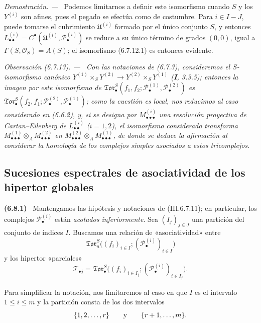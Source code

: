 \documentclass[10pt,oneside]{book}
\newcommand{\sh}[1]{\mathscr{#1}}
\newcommand{\sref}[2][]{\textup{(#2)}}
\newcommand{\oldpage}[2][]{\setcounter{footnote}{0}\marginpar{\scriptsize\textbf{#1}~|~#2}\ignorespaces}
\newenvironment{env}[1][]{\par\medskip\noindent\textbf{(#1)}\ }{\par}
\newenvironment{remark}[1][]{\par\medskip\noindent\itshape Observación (#1). ---\ }{\par}
\newenvironment{proof}{\par\medskip\noindent\textit{Demostración. ---\ }}{\par}
\providecommand{\setmin}{-}%
\begin{document}
\begin{proof}
Podemos limitarnos a definir este isomorfismo cuando $S$ y los $Y^{(i)}$ son
afines, pues el pegado se efectúa como de costumbre. Para $i\in I\setmin J$, puede
tomarse el cubrimiento $\mathfrak U^{(i)}$ formado por el único conjunto $S$,
y entonces
$L_{\bullet\bullet}^{(i)}=C^\bullet(\mathfrak U^{(i)},
\mathscr P_\bullet^{(i)})$ se reduce a su único término de grados $(0,0)$,
igual a $\Gamma(S,\mathscr O_S)=A(S)$; el isomorfismo (6.7.12.1) es entonces
evidente.
\end{proof}

\begin{remark}[6.7.13]
\label{III.6.7.13}
Con las notaciones de (6.7.3), consideremos el $S$-isomorfismo canónico
$Y^{(1)}\times_S Y^{(2)}\to Y^{(2)}\times_S Y^{(1)}$ (\textbf I, 3.3.5); entonces la
imagen por este isomorfismo de
$\mathfrak{Tor}_\bullet^S(f_1,f_2;
\mathscr P_\bullet^{(1)},\mathscr P_\bullet^{(2)})$ es
$\mathfrak{Tor}_\bullet^S(f_2,f_1;
\mathscr P_\bullet^{(2)},\mathscr P_\bullet^{(1)})$; como la cuestión es
local, nos reducimos al caso considerado en (6.6.2), y, si se designa por
$M_{\bullet\bullet\bullet}^{(i)}$ una resolución proyectiva de
Cartan--Eilenberg de $L_{\bullet\bullet}^{(i)}$ ($i=1,2$), el isomorfismo
considerado transforma
$M_{\bullet\bullet\bullet}^{(1)}\otimes_A
M_{\bullet\bullet\bullet}^{(2)}$ en
$M_{\bullet\bullet\bullet}^{(2)}\otimes_A
M_{\bullet\bullet\bullet}^{(1)}$, de donde se deduce la afirmación al
considerar la homología de los complejos simples asociados a estos
tricomplejos.
\end{remark}

\subsection{Sucesiones espectrales de asociatividad de los hipertor globales}
\label{subsection:III.6.8}
\label{III.6.8}

\begin{env}[6.8.1]
\label{III.6.8.1}
Mantengamos las hipótesis y notaciones de \sref{III.6.7.11}; en
particular, los complejos $\sh P_\bullet^{(i)}$ están \emph{acotados
inferiormente}. Sea $(I_j)_{j\in J}$ una partición del conjunto de
índices $I$. Buscamos una relación de «asociatividad» entre
\[
  \mathfrak{Tor}_n^S
  \bigl(
    (f_i)_{i\in I};
    (\sh P_\bullet^{(i)})_{i\in I}
  \bigr)
\]
y los hipertor «parciales»
\[
  \mathscr T_{\bullet j}
  =
  \mathfrak{Tor}_\bullet^S
  \bigl(
    (f_i)_{i\in I_j};
    (\sh P_\bullet^{(i)})_{i\in I_j}
  \bigr).
\]
\oldpage[III]{165}

Para simplificar la notación, nos limitaremos al caso en que $I$
es el intervalo $1\leq i\leq m$ y la partición consta de los dos
intervalos
\[
  \{1,2,\ldots,r\}
  \qquad\hbox{y}\qquad
  \{r+1,\ldots,m\}.
\]
\end{env}
\end{document}
